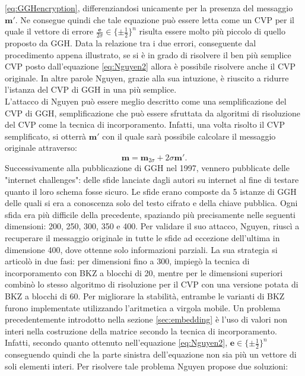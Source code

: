 \ref{eq:GGHencryption}, differenziandosi unicamente per la presenza del messaggio $\mathbf{m}'$.
Ne consegue quindi che tale equazione può essere letta come un CVP per il quale il vettore di 
errore $\frac{\mathbf{e}}{2\sigma} \in \{\pm\frac{1}{2}\}^n$ risulta essere molto più piccolo
di quello proposto da GGH. Data la relazione tra i due errori, conseguente dal procedimento appena
illustrato, se si è in grado di risolvere il ben più semplice CVP posto dall'equazione 
\ref{eq:Nguyen2} allora è possibile risolvere anche il CVP originale. In altre parole 
Nguyen, grazie alla sua intuzione, è riuscito a ridurre l'istanza del CVP di GGH in una più
semplice. \\
L'attacco di Nguyen può essere meglio descritto come una semplificazione del CVP di GGH, 
semplificazione che può essere sfruttata da algoritmi di risoluzione del CVP come la 
tecnica di incorporamento. Infatti, una volta risolto il CVP semplificato, si otterrà 
$\mathbf{m}'$ con il quale sarà possibile calcolare il messaggio originale attraverso: 
\[
    \mathbf{m} = \mathbf{m}_{2\sigma} + 2\sigma\mathbf{m}'.
\] 
Successivamente alla pubblicazione di GGH nel 1997, vennero
pubblicate delle "internet challenges": delle sfide lanciate dagli autori su internet
al fine di testare quanto il loro schema fosse sicuro. Le sfide erano composte da 5 istanze di GGH
delle quali si era a conoscenza solo del testo cifrato e della chiave pubblica. Ogni sfida 
era più difficile della precedente, spaziando più precisamente nelle seguenti dimensioni: 
200, 250, 300, 350 e 400. Per validare il suo attacco, Nguyen, riuscì a recuperare il messaggio 
originale in tutte le sfide ad eccezione dell'ultima in dimensione 400, dove ottenne solo informazioni 
parziali. La sua strategia si articolò in due fasi: per dimensioni fino a 300, impiegò la 
tecnica di incorporamento con BKZ a blocchi di 20, mentre per le dimensioni superiori combinò lo stesso 
algoritmo di risoluzione per il CVP con una versione potata di BKZ a blocchi di 60. Per migliorare la 
stabilità, entrambe le varianti di BKZ furono implementate utilizzando l'aritmetica a 
virgola mobile. Un problema precedentemente introdotto nella sezione \ref{sec:embedding} 
è l'uso di valori non interi nella costruzione della matrice secondo la tecnica di incorporamento. 
Infatti, secondo quanto ottenuto nell'equazione \ref{eq:Nguyen2}, 
$\mathbf{e} \in \{\pm\frac{1}{2}\}^n$ conseguendo quindi che la parte sinistra dell'equazione
non sia più un vettore di soli elementi interi. Per risolvere tale problema Nguyen propose
due soluzioni:
